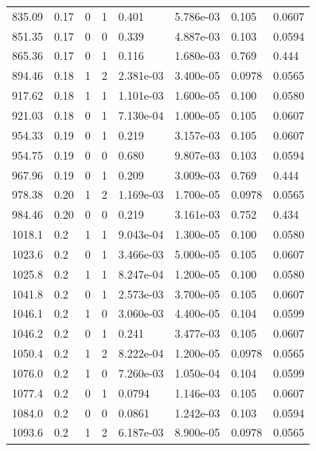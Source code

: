 \documentclass[preview]{standalone}
\begin{document}
{{{\begin{tabular}{L{1.2cm}C{1.2cm} C{0.3cm}C{0.5cm} C{1.4cm}C{1.4cm} C{1.4cm}C{1.4cm}}
  835.09  &  0.17  & 0     &  1 &  0.401  & 5.786e-03  & 0.105 &  0.0607   \\ 
  851.35  &  0.17  & 0     &  0 &  0.339  & 4.887e-03  & 0.103 &  0.0594   \\ 
  865.36  &  0.17  & 0     &  1 &  0.116  & 1.680e-03  & 0.769 &  0.444   \\ 
  894.46  &  0.18  & 1     &  2 &  2.381e-03  & 3.400e-05  & 0.0978 &  0.0565   \\ 
  917.62  &  0.18  & 1     &  1 &  1.101e-03  & 1.600e-05  & 0.100 &  0.0580   \\ 
  921.03  &  0.18  & 0     &  1 &  7.130e-04  & 1.000e-05  & 0.105 &  0.0607   \\ 
  954.33  &  0.19  & 0     &  1 &  0.219  & 3.157e-03  & 0.105 &  0.0607   \\ 
  954.75  &  0.19  & 0     &  0 &  0.680  & 9.807e-03  & 0.103 &  0.0594   \\ 
  967.96  &  0.19  & 0     &  1 &  0.209  & 3.009e-03  & 0.769 &  0.444   \\ 
  978.38  &  0.20  & 1     &  2 &  1.169e-03  & 1.700e-05  & 0.0978 &  0.0565   \\ 
  984.46  &  0.20  & 0     &  0 &  0.219  & 3.161e-03  & 0.752 &  0.434   \\ 
  1018.1  &   0.2  & 1     &  1 &  9.043e-04  & 1.300e-05  & 0.100 &  0.0580   \\ 
  1023.6  &   0.2  & 0     &  1 &  3.466e-03  & 5.000e-05  & 0.105 &  0.0607   \\ 
  1025.8  &   0.2  & 1     &  1 &  8.247e-04  & 1.200e-05  & 0.100 &  0.0580   \\ 
  1041.8  &   0.2  & 0     &  1 &  2.573e-03  & 3.700e-05  & 0.105 &  0.0607   \\ 
  1046.1  &   0.2  & 1     &  0 &  3.060e-03  & 4.400e-05  & 0.104 &  0.0599   \\ 
  1046.2  &   0.2  & 0     &  1 &  0.241  & 3.477e-03  & 0.105 &  0.0607   \\ 
  1050.4  &   0.2  & 1     &  2 &  8.222e-04  & 1.200e-05  & 0.0978 &  0.0565   \\ 
  1076.0  &   0.2  & 1     &  0 &  7.260e-03  & 1.050e-04  & 0.104 &  0.0599   \\ 
  1077.4  &   0.2  & 0     &  1 &  0.0794  & 1.146e-03  & 0.105 &  0.0607   \\ 
  1084.0  &   0.2  & 0     &  0 &  0.0861  & 1.242e-03  & 0.103 &  0.0594   \\ 
  1093.6  &   0.2  & 1     &  2 &  6.187e-03  & 8.900e-05  & 0.0978 &  0.0565   \\ 

\end{tabular}}}}
\end{document}
